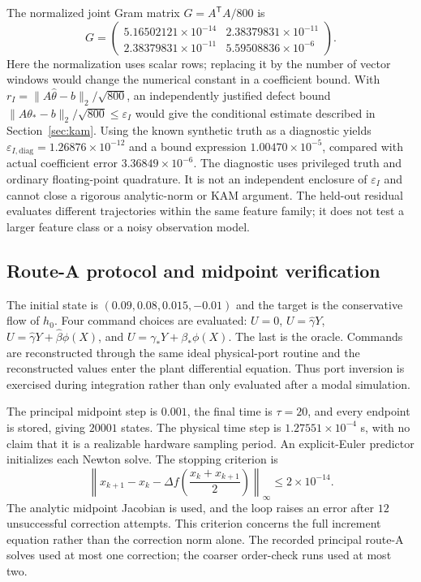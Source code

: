 The normalized joint Gram matrix $G=A^{\mathsf T}A/800$ is
\begin{equation}
 G=\begin{pmatrix}5.16502121\times10^{-14} & 2.38379831\times10^{-11}\\2.38379831\times10^{-11} & 5.59508836\times10^{-6}\end{pmatrix}.
 \label{sx:gram}
\end{equation}
Here the normalization uses scalar rows; replacing it by the number
of vector windows would change the numerical constant in a
coefficient bound. With $r_I=\|A\widehat\theta-b\|_2/\sqrt{800}$,
an independently justified defect bound
$\|A\theta_*-b\|_2/\sqrt{800}\leq\varepsilon_I$ would give
the conditional estimate described in Section~\ref{sec:kam}.
Using the known synthetic truth as a diagnostic yields
$\varepsilon_{I,\mathrm{diag}}=1.26876\times10^{-12}$ and a bound expression
$1.00470\times10^{-5}$, compared with actual coefficient error
$3.36849\times10^{-6}$. The diagnostic uses privileged truth and ordinary
floating-point quadrature. It is not an independent enclosure of
$\varepsilon_I$ and cannot close a rigorous analytic-norm or KAM
argument. The held-out residual evaluates different trajectories
within the same feature family; it does not test a larger feature
class or a noisy observation model.

\subsection{Route-A protocol and midpoint verification}
\label{sx:route-a}
The initial state is $(0.09,0.08,0.015,-0.01)$ and the target is the
conservative flow of $h_0$. Four command choices are evaluated:
$U=0$, $U=\widehat\gamma Y$,
$U=\widehat\gamma Y+\widehat\beta\phi(X)$, and
$U=\gamma_*Y+\beta_*\phi(X)$.
The last is the oracle. Commands are reconstructed through the same
ideal physical-port routine and the reconstructed values enter the
plant differential equation. Thus port inversion is exercised during
integration rather than only evaluated after a modal simulation.

The principal midpoint step is $0.001$, the final time is $\tau=20$,
and every endpoint is stored, giving $20001$ states.
The physical time step is $1.27551\times10^{-4}$ s, with no claim that
it is a realizable hardware sampling period. An explicit-Euler
predictor initializes each Newton solve. The stopping criterion is
\begin{equation}
 \left\|x_{k+1}-x_k-
 \Delta f\!\left(\frac{x_k+x_{k+1}}2\right)\right\|_\infty
 \leq2\times10^{-14}.
 \label{sx:newton-stop}
\end{equation}
The analytic midpoint Jacobian is used, and the loop raises an error
after $12$ unsuccessful correction attempts. This criterion concerns
the full increment equation rather than the correction norm alone.
The recorded principal route-A solves used at most one correction;
the coarser order-check runs used at most two.

